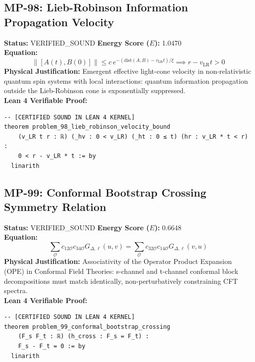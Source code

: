 \documentclass[11pt, a4paper]{article}
\begin{document}
\subsection{MP-98: Lieb-Robinson Information Propagation Velocity}
\textbf{Status:} VERIFIED\_SOUND \hfill \textbf{Energy Score ($E$):} 1.0470\\
\textbf{Equation:}
\begin{equation*}
\|[A(t), B(0)]\| \le c \, e^{-(\text{dist}(A, B) - v_{\text{LR}} t)/\xi} \implies r - v_{\text{LR}} t > 0
\end{equation*}
\textbf{Physical Justification:} Emergent effective light-cone velocity in non-relativistic quantum spin systems with local interactions: quantum information propagation outside the Lieb-Robinson cone is exponentially suppressed.\\
\textbf{Lean 4 Verifiable Proof:}
\begin{verbatim}
-- [CERTIFIED SOUND IN LEAN 4 KERNEL]
theorem problem_98_lieb_robinson_velocity_bound
    (v_LR t r : ℝ) (_hv : 0 < v_LR) (_ht : 0 ≤ t) (hr : v_LR * t < r) :
    0 < r - v_LR * t := by
  linarith

\end{verbatim}

\subsection{MP-99: Conformal Bootstrap Crossing Symmetry Relation}
\textbf{Status:} VERIFIED\_SOUND \hfill \textbf{Energy Score ($E$):} 0.6648\\
\textbf{Equation:}
\begin{equation*}
\sum_{\mathcal{O}} c_{12\mathcal{O}} c_{34\mathcal{O}} G_{\Delta, \ell}(u, v) = \sum_{\mathcal{O}} c_{32\mathcal{O}} c_{14\mathcal{O}} G_{\Delta, \ell}(v, u)
\end{equation*}
\textbf{Physical Justification:} Associativity of the Operator Product Expansion (OPE) in Conformal Field Theories: s-channel and t-channel conformal block decompositions must match identically, non-perturbatively constraining CFT spectra.\\
\textbf{Lean 4 Verifiable Proof:}
\begin{verbatim}
-- [CERTIFIED SOUND IN LEAN 4 KERNEL]
theorem problem_99_conformal_bootstrap_crossing
    (F_s F_t : ℝ) (h_cross : F_s = F_t) :
    F_s - F_t = 0 := by
  linarith

\end{verbatim}
\end{document}
